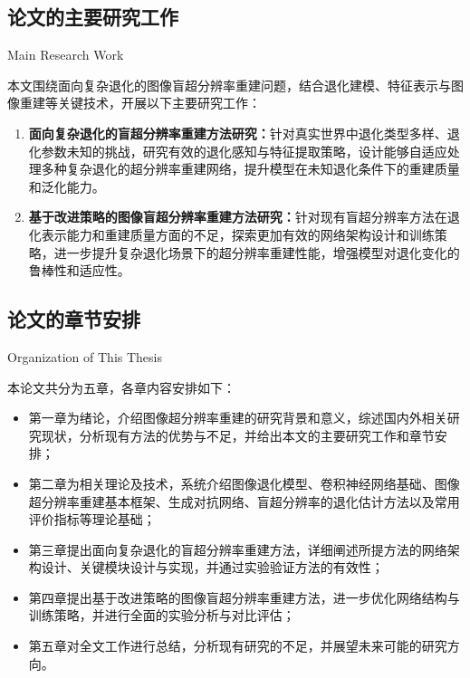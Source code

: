\subsection{论文的主要研究工作}{Main Research Work}

本文围绕面向复杂退化的图像盲超分辨率重建问题，结合退化建模、特征表示与图像重建等关键技术，开展以下主要研究工作：

\begin{enumerate}
  \item \textbf{面向复杂退化的盲超分辨率重建方法研究：}针对真实世界中退化类型多样、退化参数未知的挑战，研究有效的退化感知与特征提取策略，设计能够自适应处理多种复杂退化的超分辨率重建网络，提升模型在未知退化条件下的重建质量和泛化能力。
  \item \textbf{基于改进策略的图像盲超分辨率重建方法研究：}针对现有盲超分辨率方法在退化表示能力和重建质量方面的不足，探索更加有效的网络架构设计和训练策略，进一步提升复杂退化场景下的超分辨率重建性能，增强模型对退化变化的鲁棒性和适应性。
\end{enumerate}

\subsection{论文的章节安排}{Organization of This Thesis}

本论文共分为五章，各章内容安排如下：
\begin{itemize}
  \item 第一章为绪论，介绍图像超分辨率重建的研究背景和意义，综述国内外相关研究现状，分析现有方法的优势与不足，并给出本文的主要研究工作和章节安排；
  \item 第二章为相关理论及技术，系统介绍图像退化模型、卷积神经网络基础、图像超分辨率重建基本框架、生成对抗网络、盲超分辨率的退化估计方法以及常用评价指标等理论基础；
  \item 第三章提出面向复杂退化的盲超分辨率重建方法，详细阐述所提方法的网络架构设计、关键模块设计与实现，并通过实验验证方法的有效性；
  \item 第四章提出基于改进策略的图像盲超分辨率重建方法，进一步优化网络结构与训练策略，并进行全面的实验分析与对比评估；
  \item 第五章对全文工作进行总结，分析现有研究的不足，并展望未来可能的研究方向。
\end{itemize}
